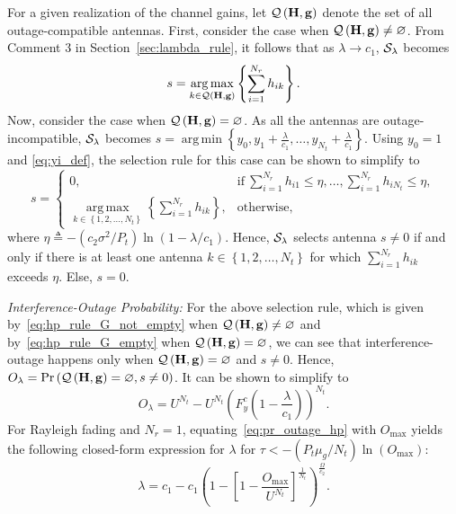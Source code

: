 \documentclass[12pt,draftcls,peerreview,onecolumn]{IEEEtran}
\newcommand{\brac}[1]{\left({#1}\right)}
\newcommand{\define}{\triangleq}
\newcommand{\tendsto}{\to}
\newcommand{\mtx}[1]{{\bf #1}} %
\newcommand{\prob}[1]{\text{Pr}\brac{#1}}
\DeclareMathOperator*{\argmin}{arg\,min}
\DeclareMathOperator*{\argmax}{arg\,max}
\newcommand{\nx}{{0}}
\newcommand{\lam}{\lambda}
\newcommand{\mug}{{\mu_{g}}}
\newcommand{\goodset}{\cal{Q\left(\Hmx,\g \right) }}
\newcommand{\Nt}{{N_t}}
\newcommand{\Nr}{{N_r}}
\newcommand{\Pt}{{P_t}}
\newcommand{\such}{h}
\newcommand{\puch}{g}
\newcommand{\hk}[1]{{\such_{#1}}}
\newcommand{\g}{\mathbf{\puch}}
\newcommand{\noisevar}{\sigma^2}
\newcommand{\outmax}{O_{\text{max}}}
\newcommand{\itau}{\tau}
\newcommand{\cone}{c_{1}}
\newcommand{\ctwo}{c_{2}}
\newcommand{\out}{O}
\newcommand{\lambym}{\frac{\lam}{\cone}}
\newcommand{\yk}[1]{y_{#1}}
\newcommand{\al}{\ctwo}
\newcommand{\snr}{\Omega}
\newcommand{\albysnr}[1][]{\frac{\al#1}{\snr}}
\newcommand{\snrbyal}[1][]{\frac{\snr#1}{\al}}
\newcommand{\un}{U}
\newcommand{\antopts}{\left\{1,2,\ldots,\Nt\right\}}
\newcommand{\igammainline}{{- \left( {\al\noisevar}/{\Pt}\right)  \ln\left({1-\lam/\cone }\right) }}
\newcommand{\Hmx}{\mtx{H}}
\newcommand{\callamrule}{{\cal S_{{\lam}}}}
\newcommand{\outlam}{\out_{\lam}}
\newcommand{\nullset}{\varnothing}
\newcommand{\ccdfyrv}[1]{ F^{c}_{y}\left(#1 \right) }
\newcommand{\sumnr}{\sum_{i=1}^{\Nr}}
\begin{document}
\newcommand{\gammath}{\eta}
For a given realization of the channel gains, let $\goodset$ denote the set of all outage-compatible antennas. First, consider the case when $\goodset\neq\nullset$. From Comment 3 in Section~\ref{sec:lambda_rule}, it follows that as $\lam \tendsto \cone$, $\callamrule$ becomes 
\begin{equation}
\label{eq:hp_rule_G_not_empty}
s = \argmax_{k\in\goodset}\left\lbrace \sumnr \hk{ik}\right\rbrace. 
\end{equation}
Now, consider the case when $\goodset= \nullset$. As all the antennas are outage-incompatible, $\callamrule$ becomes $s = \argmin\left\lbrace  \yk{0},\yk{1}+\lambym,\ldots,\yk{\Nt}+\lambym \right\rbrace$. Using $\yk{0}=1$ and \eqref{eq:yi_def}, the selection rule for this case can be shown to simplify to  
\begin{equation}
\label{eq:hp_rule_G_empty}
s = \left\{
\begin{array}{ll}
0 , & \text{if}~\sumnr\hk{i1}\leq\gammath,\ldots, \sumnr\hk{i\Nt}\leq\gammath, \\
\argmax\limits_{k\in\antopts}\left\lbrace \sumnr\hk{ik}\right\rbrace , &\text{otherwise},
\end{array}\right.
\end{equation}
where $\gammath\define\igammainline$. Hence, $\callamrule$ selects antenna $s\neq0$ if and only if there is at least one antenna $k\in\antopts$ for which $\sumnr \hk{ik}$ exceeds $\gammath$. Else, $s=0$. 


{\em Interference-Outage Probability:} For the above selection rule, which is given by~\eqref{eq:hp_rule_G_not_empty} when $\goodset\neq\nullset$ and by~\eqref{eq:hp_rule_G_empty} when $\goodset=\nullset$, we can see that interference-outage happens only when $\goodset=\nullset$ and  $s\neq\nx$. Hence,  $\outlam=\prob{{\goodset}=\nullset, s \neq 0}$. It can be shown to simplify to
\begin{equation}
\label{eq:pr_outage_hp}
\outlam = \un^{\Nt} - \un^{\Nt}\left(\ccdfyrv{1-\lambym} \right)^{\Nt}.
\end{equation}
%
For Rayleigh fading and $\Nr=1$, equating~\eqref{eq:pr_outage_hp} with $\outmax$ yields the following closed-form expression for $\lam$ for $\itau<-\left({\Pt\mug}/{\Nt}\right) \ln\left({\outmax}\right)$: 
\begin{equation}
\label{eq:lam_asym}
\lam  =  \cone - \cone\left(1 - \left[1 - \frac{\outmax}{\un^{\Nt}}\right]^{\frac{1}{\Nt}} \right)^{\snrbyal[]}.
\end{equation}
%
\end{document}
